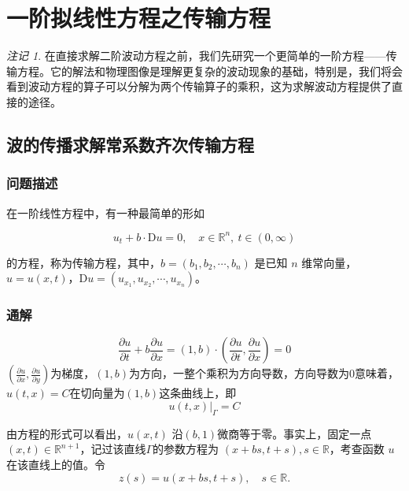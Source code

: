 \documentclass[a4paper, 12pt, oneside]{article} %
\numberwithin{subsection}{section}
\numberwithin{subsubsection}{subsection}
\theoremstyle{plain}
\theoremstyle{definition}
\theoremstyle{remark}
\newtheorem{remark}[theorem]{注记}
\begin{document}
		
		\section{一阶拟线性方程之传输方程} 
		\begin{remark}
			在直接求解二阶波动方程之前，我们先研究一个更简单的一阶方程——传输方程。它的解法和物理图像是理解更复杂的波动现象的基础，特别是，我们将会看到波动方程的算子可以分解为两个传输算子的乘积，这为求解波动方程提供了直接的途径。
		\end{remark}
		
		\subsection{波的传播求解常系数齐次传输方程} 
		\subsubsection{问题描述}
		在一阶线性方程中，有一种最简单的形如
		
		\begin{equation}
			u_t + b \cdot \mathrm{D}u = 0, \quad x \in \mathbb{R}^n, \ t \in (0, \infty)
		\end{equation}
		
		的方程，称为传输方程，其中，\(b = (b_1, b_2, \cdots, b_n)\) 是已知 \(n\) 维常向量，\(u = u(x, t)\)，\(\mathrm{D}u = (u_{x_1}, u_{x_2}, \cdots, u_{x_n})\)。
		
		\subsubsection{通解} 
		\begin{equation}
			\frac{\partial u}{\partial t} + b \frac{\partial u}{\partial x}=(1, b) \cdot \left( \frac{\partial u}{\partial t}, \frac{\partial u}{\partial x} \right) = 0 
		\end{equation}
		$\left( \frac{\partial u}{\partial x}, \frac{\partial u}{\partial y} \right)$为梯度，$(1, b)$为方向，一整个乘积为方向导数，方向导数为0意味着，$u(t, x)=C$在切向量为$(1, b)$这条曲线上，即
		\begin{equation}
			u(t,x)|_{\Gamma} = C
		\end{equation}
		
		
		由方程的形式可以看出，\(u(x, t)\) 沿$(b, 1)$微商等于零。事实上，固定一点 \((x, t) \in \mathbb{R}^{n+1}\)，记过该直线$\Gamma$的参数方程为 \((x + bs, t + s), s \in \mathbb{R}\)，考查函数 \(u\) 在该直线上的值。令
		\begin{equation}
			z(s) = u(x + bs, t + s), \quad s \in \mathbb{R}.
		\end{equation}
		
\end{document}
